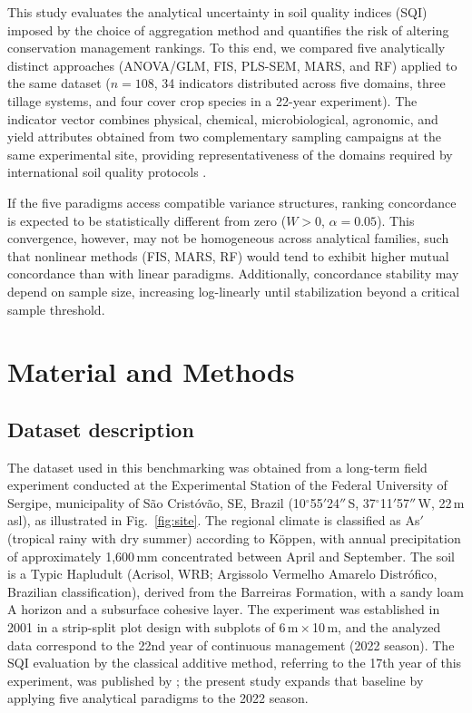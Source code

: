 \documentclass[pdflatex,sn-basic]{sn-jnl}%
\begin{document}
This study evaluates the analytical uncertainty in soil quality indices (SQI) imposed by the choice of aggregation method and quantifies the risk of altering conservation management rankings. To this end, we compared five analytically distinct approaches (ANOVA/GLM, FIS, PLS-SEM, MARS, and RF) applied to the same dataset ($n = 108$, 34 indicators distributed across five domains, three tillage systems, and four cover crop species in a 22-year experiment). The indicator vector combines physical, chemical, microbiological, agronomic, and yield attributes obtained from two complementary sampling campaigns at the same experimental site, providing representativeness of the domains required by international soil quality protocols \citep{Karlen1997,Andrews2002}.

If the five paradigms access compatible variance structures, ranking concordance is expected to be statistically different from zero ($W > 0$, $\alpha = 0.05$). This convergence, however, may not be homogeneous across analytical families, such that nonlinear methods (FIS, MARS, RF) would tend to exhibit higher mutual concordance than with linear paradigms. Additionally, concordance stability may depend on sample size, increasing log-linearly until stabilization beyond a critical sample threshold.

\section{Material and Methods}\label{sec:material}

\subsection{Dataset description}\label{subsec:dataset}

The dataset used in this benchmarking was obtained from a long-term field experiment conducted at the Experimental Station of the Federal University of Sergipe, municipality of S\~{a}o Crist\'{o}v\~{a}o, SE, Brazil (10$^\circ$55$'$24$''$\,S, 37$^\circ$11$'$57$''$\,W, 22\,m asl), as illustrated in Fig.~\ref{fig:site}. The regional climate is classified as As$'$ (tropical rainy with dry summer) according to K\"{o}ppen, with annual precipitation of approximately 1,600\,mm concentrated between April and September. The soil is a Typic Hapludult (Acrisol, WRB; Argissolo Vermelho Amarelo Distr\'{o}fico, Brazilian classification), derived from the Barreiras Formation, with a sandy loam A horizon and a subsurface cohesive layer. The experiment was established in 2001 in a strip-split plot design with subplots of 6\,m\,$\times$\,10\,m, and the analyzed data correspond to the 22nd year of continuous management (2022 season). The SQI evaluation by the classical additive method, referring to the 17th year of this experiment, was published by \cite{Assuncao2023}; the present study expands that baseline by applying five analytical paradigms to the 2022 season.
\end{document}
